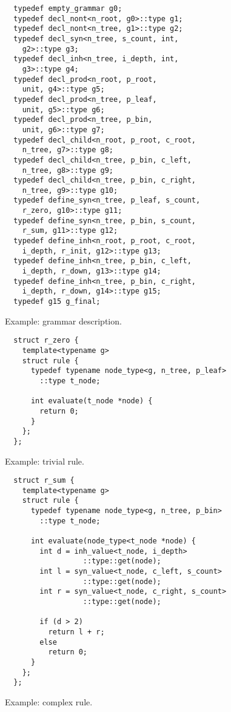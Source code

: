 \documentclass{llncs}
\begin{document}
  \begin{figure}[ht]
  \begin{lstlisting}
  typedef empty_grammar g0;
  typedef decl_nont<n_root, g0>::type g1;
  typedef decl_nont<n_tree, g1>::type g2;
  typedef decl_syn<n_tree, s_count, int,
    g2>::type g3;
  typedef decl_inh<n_tree, i_depth, int,
    g3>::type g4;
  typedef decl_prod<n_root, p_root,
    unit, g4>::type g5;
  typedef decl_prod<n_tree, p_leaf,
    unit, g5>::type g6;
  typedef decl_prod<n_tree, p_bin,
    unit, g6>::type g7;
  typedef decl_child<n_root, p_root, c_root,
    n_tree, g7>::type g8;
  typedef decl_child<n_tree, p_bin, c_left,
    n_tree, g8>::type g9;
  typedef decl_child<n_tree, p_bin, c_right,
    n_tree, g9>::type g10;
  typedef define_syn<n_tree, p_leaf, s_count,
    r_zero, g10>::type g11;
  typedef define_syn<n_tree, p_bin, s_count,
    r_sum, g11>::type g12;
  typedef define_inh<n_root, p_root, c_root,
    i_depth, r_init, g12>::type g13;
  typedef define_inh<n_tree, p_bin, c_left,
    i_depth, r_down, g13>::type g14;
  typedef define_inh<n_tree, p_bin, c_right,
    i_depth, r_down, g14>::type g15;
  typedef g15 g_final;
  \end{lstlisting}
  \caption{Example: grammar description.}
  \label{fig:example:grammar}
  \end{figure}

  \begin{figure}[ht]
  \begin{lstlisting}
  struct r_zero {
    template<typename g>
    struct rule {
      typedef typename node_type<g, n_tree, p_leaf>
        ::type t_node;

      int evaluate(t_node *node) {
        return 0;
      }
    };
  };
  \end{lstlisting}
  \caption{Example: trivial rule.}
  \label{fig:example:rule1}
  \end{figure}
 
  \begin{figure}[ht]
  \begin{lstlisting}
  struct r_sum {
    template<typename g>
    struct rule {
      typedef typename node_type<g, n_tree, p_bin>
        ::type t_node;

      int evaluate(node_type<t_node *node) {
        int d = inh_value<t_node, i_depth>
                  ::type::get(node);
        int l = syn_value<t_node, c_left, s_count>
                  ::type::get(node);
        int r = syn_value<t_node, c_right, s_count>
                  ::type::get(node);

        if (d > 2)
          return l + r;
        else
          return 0;
      }
    };
  };
  \end{lstlisting}
  \caption{Example: complex rule.}
  \label{fig:example:rule2}
  \end{figure}
\end{document}
